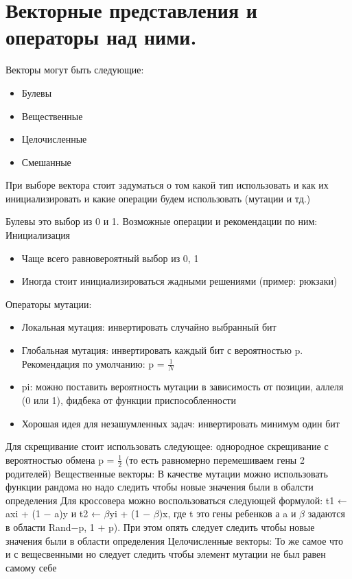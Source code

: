 \section{Векторные представления и операторы над ними.}
Векторы могут быть следующие: 
\begin{itemize}
\item Булевы
\item Вещественные
\item Целочисленные
\item Смешанные
\end{itemize}
При выборе вектора стоит задуматься о том какой тип использовать и как их инициализировать и какие операции будем использовать (мутации и тд.)

Булевы это выбор из 0 и 1. 
Возможные операции и рекомендации по ним:
Инициализация
\begin{itemize}
\item Чаще всего равновероятный выбор из {0, 1}
\item Иногда стоит инициализироваться жадными решениями (пример: рюкзаки)
\end{itemize}
Операторы мутации:
\begin{itemize}
\item Локальная мутация: инвертировать случайно выбранный бит
\item Глобальная мутация: инвертировать каждый бит с вероятностью p. Рекомендация по умолчанию: p = $\frac{1}{N}$
\item pi: можно поставить вероятность мутации в зависимость от позиции, аллеля (0 или 1), фидбека от функции приспособленности
\item Хорошая идея для незашумленных задач: инвертировать минимум один бит
\end{itemize}
Для скрещивание стоит использовать следующее: однородное скрещивание с вероятностью обмена p = $\frac{1}{2}$ (то есть равномерно перемешиваем гены 2 родителей)
Вещественные векторы:
В качестве мутации можно использовать функции рандома но надо следить чтобы новые значения были в обалсти определения
Для кроссовера можно воспользоваться следующей формулой: t1 ← axi + (1 − a)y и t2 ← $\beta$yi + (1 − $\beta$)x, где t это гены ребенков а a и $\beta$ задаются в области Rand−p, 1 + p). При этом опять следует следить чтобы новые значения были в области определения
Целочисленные векторы:
То же самое что и с вещесвенными но следует следить чтобы элемент мутации не был равен самому себе
